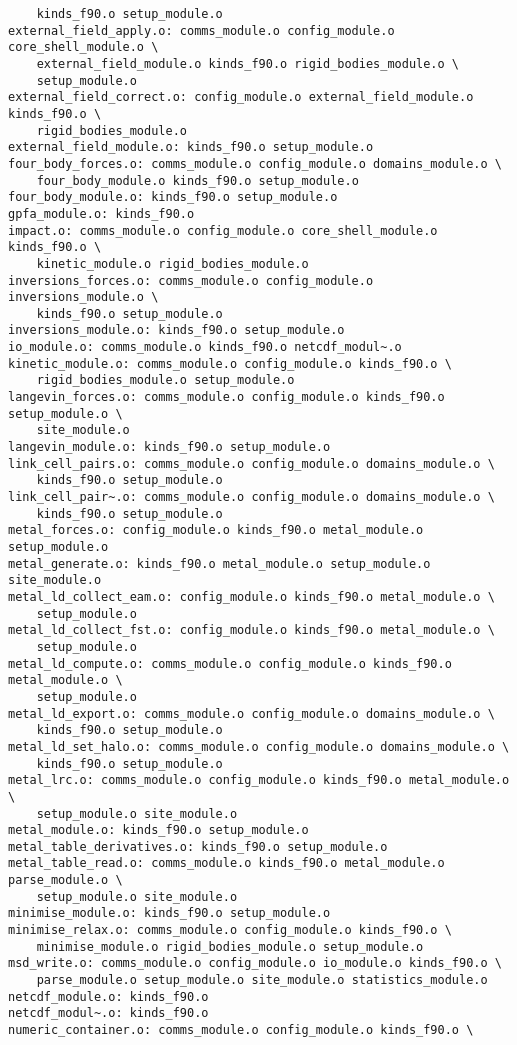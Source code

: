 \begin{verbatim}
	kinds_f90.o setup_module.o
external_field_apply.o: comms_module.o config_module.o core_shell_module.o \
	external_field_module.o kinds_f90.o rigid_bodies_module.o \
	setup_module.o
external_field_correct.o: config_module.o external_field_module.o kinds_f90.o \
	rigid_bodies_module.o
external_field_module.o: kinds_f90.o setup_module.o
four_body_forces.o: comms_module.o config_module.o domains_module.o \
	four_body_module.o kinds_f90.o setup_module.o
four_body_module.o: kinds_f90.o setup_module.o
gpfa_module.o: kinds_f90.o
impact.o: comms_module.o config_module.o core_shell_module.o kinds_f90.o \
	kinetic_module.o rigid_bodies_module.o
inversions_forces.o: comms_module.o config_module.o inversions_module.o \
	kinds_f90.o setup_module.o
inversions_module.o: kinds_f90.o setup_module.o
io_module.o: comms_module.o kinds_f90.o netcdf_modul~.o
kinetic_module.o: comms_module.o config_module.o kinds_f90.o \
	rigid_bodies_module.o setup_module.o
langevin_forces.o: comms_module.o config_module.o kinds_f90.o setup_module.o \
	site_module.o
langevin_module.o: kinds_f90.o setup_module.o
link_cell_pairs.o: comms_module.o config_module.o domains_module.o \
	kinds_f90.o setup_module.o
link_cell_pair~.o: comms_module.o config_module.o domains_module.o \
	kinds_f90.o setup_module.o
metal_forces.o: config_module.o kinds_f90.o metal_module.o setup_module.o
metal_generate.o: kinds_f90.o metal_module.o setup_module.o site_module.o
metal_ld_collect_eam.o: config_module.o kinds_f90.o metal_module.o \
	setup_module.o
metal_ld_collect_fst.o: config_module.o kinds_f90.o metal_module.o \
	setup_module.o
metal_ld_compute.o: comms_module.o config_module.o kinds_f90.o metal_module.o \
	setup_module.o
metal_ld_export.o: comms_module.o config_module.o domains_module.o \
	kinds_f90.o setup_module.o
metal_ld_set_halo.o: comms_module.o config_module.o domains_module.o \
	kinds_f90.o setup_module.o
metal_lrc.o: comms_module.o config_module.o kinds_f90.o metal_module.o \
	setup_module.o site_module.o
metal_module.o: kinds_f90.o setup_module.o
metal_table_derivatives.o: kinds_f90.o setup_module.o
metal_table_read.o: comms_module.o kinds_f90.o metal_module.o parse_module.o \
	setup_module.o site_module.o
minimise_module.o: kinds_f90.o setup_module.o
minimise_relax.o: comms_module.o config_module.o kinds_f90.o \
	minimise_module.o rigid_bodies_module.o setup_module.o
msd_write.o: comms_module.o config_module.o io_module.o kinds_f90.o \
	parse_module.o setup_module.o site_module.o statistics_module.o
netcdf_module.o: kinds_f90.o
netcdf_modul~.o: kinds_f90.o
numeric_container.o: comms_module.o config_module.o kinds_f90.o \

\end{verbatim}
